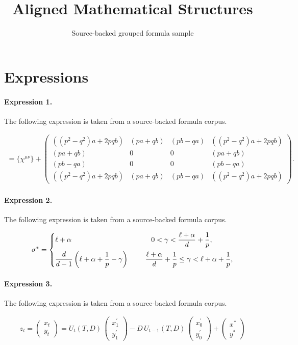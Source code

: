 \documentclass[11pt]{article}
\title{Aligned Mathematical Structures}
\author{Source-backed grouped formula sample}
\date{}
\begin{document}
\maketitle
\section{Expressions}
\paragraph{Expression 1.} The following expression is taken from a source-backed formula corpus.

\begin{align*}= \{\chi^{\mu\nu}\} +\left(\begin{array}{cccc}((p^2 - q^2)a + 2pqb) & (pa + qb) & (pb -qa) & ((p^2 - q^2)a + 2pqb) \\(pa + qb) &0 & 0 & (pa + qb) \\(pb -qa) & 0 & 0 & (pb -qa) \\((p^2 - q^2)a + 2pqb) &( pa + qb) &( pb -qa) & ((p^2 - q^2)a + 2pqb)\end{array}\right).\end{align*}

\paragraph{Expression 2.} The following expression is taken from a source-backed formula corpus.

\begin{align*}\sigma^* = \begin{dcases}\ell + \alpha&\;\qquad0 < \gamma < \frac{\ell+\alpha}{d} + \frac{1}{p},\\\frac{d}{d-1} \left( \ell + \alpha + \frac{1}{p} - \gamma \right)&\;\quad\,\frac{\ell+\alpha}{d} + \frac{1}{p} \leq \gamma < \ell + \alpha + \frac{1}{p},\end{dcases}\end{align*}

\paragraph{Expression 3.} The following expression is taken from a source-backed formula corpus.

\begin{align*} z_t = \begin{pmatrix} {x}_t \\ {y}_t \end{pmatrix} =U_t({T},{D})\, \begin{pmatrix} {x}_1^\prime \\ {y}_1^\prime \end{pmatrix}- {D}\, U_{t-1}({T},{D})\, \begin{pmatrix} {x}_0^\prime \\ {y}_0^\prime \end{pmatrix}+ \begin{pmatrix} {x}^* \\ {y}^* \end{pmatrix}\end{align*}
\end{document}
